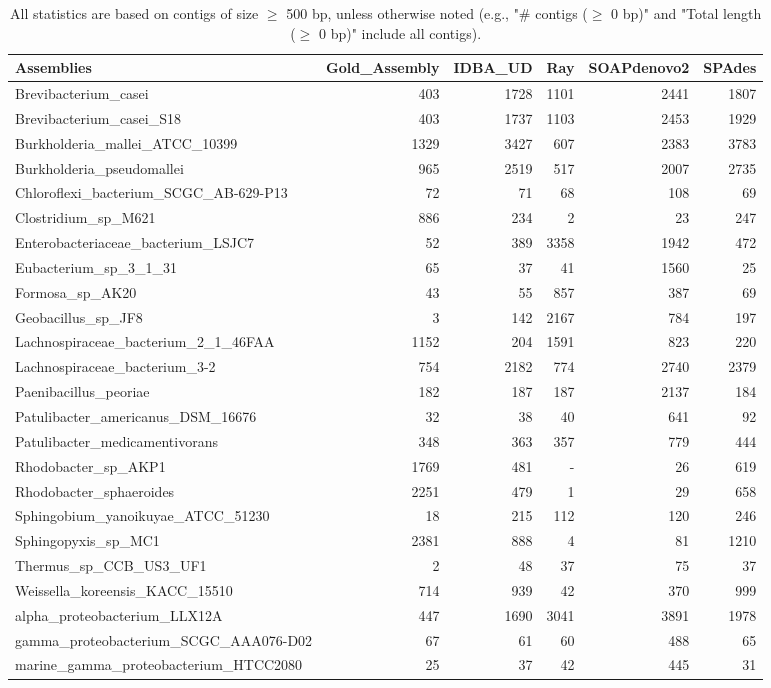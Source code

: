 \documentclass[12pt,a4paper]{article}
\begin{document}
\begin{table}[ht]
\begin{center}
\caption{All statistics are based on contigs of size $\geq$ 500 bp, unless otherwise noted (e.g., "\# contigs ($\geq$ 0 bp)" and "Total length ($\geq$ 0 bp)" include all contigs).}
\begin{tabular}{|l*{5}{|r}|}
\hline
Assemblies & Gold\_Assembly & IDBA\_UD & Ray & SOAPdenovo2 & SPAdes \\ \hline
Brevibacterium\_casei & 403 & 1728 & 1101 & 2441 & 1807 \\ \hline
Brevibacterium\_casei\_S18 & 403 & 1737 & 1103 & 2453 & 1929 \\ \hline
Burkholderia\_mallei\_ATCC\_10399 & 1329 & 3427 & 607 & 2383 & 3783 \\ \hline
Burkholderia\_pseudomallei & 965 & 2519 & 517 & 2007 & 2735 \\ \hline
Chloroflexi\_bacterium\_SCGC\_AB-629-P13 & 72 & 71 & 68 & 108 & 69 \\ \hline
Clostridium\_sp\_M621 & 886 & 234 & 2 & 23 & 247 \\ \hline
Enterobacteriaceae\_bacterium\_LSJC7 & 52 & 389 & 3358 & 1942 & 472 \\ \hline
Eubacterium\_sp\_3\_1\_31 & 65 & 37 & 41 & 1560 & 25 \\ \hline
Formosa\_sp\_AK20 & 43 & 55 & 857 & 387 & 69 \\ \hline
Geobacillus\_sp\_JF8 & 3 & 142 & 2167 & 784 & 197 \\ \hline
Lachnospiraceae\_bacterium\_2\_1\_46FAA & 1152 & 204 & 1591 & 823 & 220 \\ \hline
Lachnospiraceae\_bacterium\_3-2 & 754 & 2182 & 774 & 2740 & 2379 \\ \hline
Paenibacillus\_peoriae & 182 & 187 & 187 & 2137 & 184 \\ \hline
Patulibacter\_americanus\_DSM\_16676 & 32 & 38 & 40 & 641 & 92 \\ \hline
Patulibacter\_medicamentivorans & 348 & 363 & 357 & 779 & 444 \\ \hline
Rhodobacter\_sp\_AKP1 & 1769 & 481 & - & 26 & 619 \\ \hline
Rhodobacter\_sphaeroides & 2251 & 479 & 1 & 29 & 658 \\ \hline
Sphingobium\_yanoikuyae\_ATCC\_51230 & 18 & 215 & 112 & 120 & 246 \\ \hline
Sphingopyxis\_sp\_MC1 & 2381 & 888 & 4 & 81 & 1210 \\ \hline
Thermus\_sp\_CCB\_US3\_UF1 & 2 & 48 & 37 & 75 & 37 \\ \hline
Weissella\_koreensis\_KACC\_15510 & 714 & 939 & 42 & 370 & 999 \\ \hline
alpha\_proteobacterium\_LLX12A & 447 & 1690 & 3041 & 3891 & 1978 \\ \hline
gamma\_proteobacterium\_SCGC\_AAA076-D02 & 67 & 61 & 60 & 488 & 65 \\ \hline
marine\_gamma\_proteobacterium\_HTCC2080 & 25 & 37 & 42 & 445 & 31 \\ \hline
\end{tabular}
\end{center}
\end{table}
\end{document}
